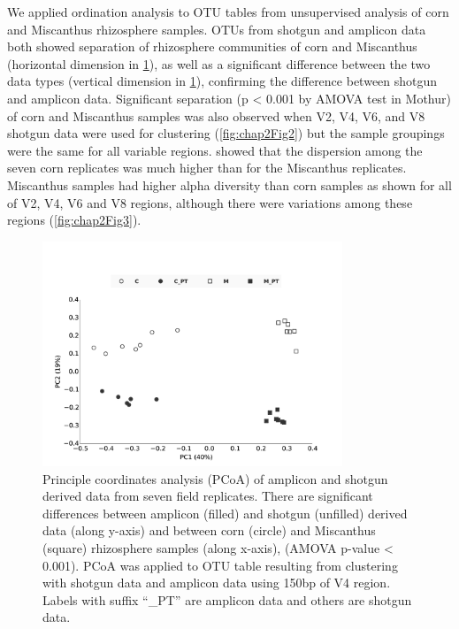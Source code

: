\documentclass[]{msu-thesis}
\begin{document}
We applied ordination analysis to OTU tables from unsupervised analysis of corn and Miscanthus rhizosphere samples. OTUs from shotgun and amplicon data both showed separation of rhizosphere communities of corn and Miscanthus (horizontal dimension in \cref{fig:chap2Fig1}), as well as a significant difference between the two data types (vertical dimension in \cref{fig:chap2Fig1}), confirming the difference between shotgun and amplicon data. Significant separation (p < 0.001 by AMOVA test in Mothur) of corn and Miscanthus samples was also observed when V2, V4, V6, and V8 shotgun data were used for clustering (\cref{fig:chap2Fig2}) but the sample groupings were the same for all variable regions.  showed that the dispersion among the seven corn replicates was much higher than for the Miscanthus replicates. Miscanthus samples had higher alpha diversity than corn samples as shown for all of V2, V4, V6 and V8 regions, although there were variations among these regions (\cref{fig:chap2Fig3}).


\begin{figure}[tbph!]
  \centering
  \includegraphics[width=0.80\textwidth]{figs/chap2_fig1}
  \caption[Ordination of amplicon and shotgun data from the same samples]{Principle coordinates analysis (PCoA) of amplicon and shotgun derived data from seven field replicates. There are significant differences between amplicon (filled) and shotgun (unfilled) derived data (along y-axis) and between corn (circle) and Miscanthus (square) rhizosphere samples (along x-axis), (AMOVA p-value < 0.001). PCoA was applied to OTU table resulting from clustering with shotgun data and amplicon data using 150bp of V4 region. Labels with suffix ``\_PT'' are amplicon data and others are shotgun data.}
  \label{fig:chap2Fig1}
\end{figure}
\end{document}
